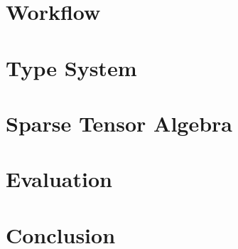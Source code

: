 \documentclass[acmsmall,nonacm]{acmart}\settopmatter{printfolios=true,printccs=false,printacmref=false}
\begin{document}
\section{Workflow}\label{workflow}
\section{Type System}\label{typesystem}
\section{Sparse Tensor Algebra}\label{sparse}
\section{Evaluation}\label{evaluation}
\section{Conclusion}\label{conclusion}


\end{document}
